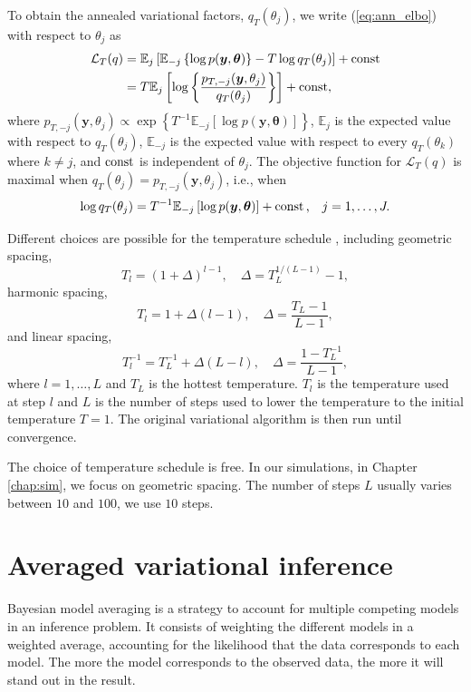\documentclass[a4paper, 11pt]{report}
\numberwithin{equation}{chapter}
\DeclareMathOperator*{\const}{{\rm const}}
\begin{document}
To obtain the annealed variational factors, $q_T(\theta_j)$, we write (\ref{eq:ann_elbo}) with respect to $\theta_j$ as
\begin{align*}
\mathcal{L}_T(q) &= \mathbb{E}_j\left[\mathbb{E}_{-j}\left\lbrace \log p(\boldsymbol{y},\boldsymbol{\theta})\right\rbrace - T \log q_T(\theta_j)\right]+ \const\\
&= T\mathbb{E}_j\left[\log\left\lbrace\frac{p_{T, -j}(\boldsymbol{y}, \theta_j)}{q_T(\theta_j)}\right\rbrace\right] + \const,	
\end{align*}
where $p_{T, -j}(\boldsymbol{y},\theta_j) \propto \exp\left\lbrace T^{-1}\mathbb{E}_{-j}\left[\log p(\boldsymbol{y},\boldsymbol{\theta})\right]\right\rbrace$, $\mathbb{E}_j$ is the expected value with respect to $q_T(\theta_j)$, $\mathbb{E}_{-j}$ is the expected value with respect to every $ q_T(\theta_k)$ where $k \neq j$, and $\const$ is independent of $\theta_j$. The objective function for $\mathcal{L}_T(q)$ is maximal when $q_T(\theta_j) = p_{T,-j}(\boldsymbol{y},\theta_j)$, i.e., when
\begin{equation*}
\log q_T(\theta_j) = T^{-1} \mathbb{E}_{-j}\left[\log p(\boldsymbol{y}, \boldsymbol{\theta})\right] + \const\text{,}\quad j=1,\dots,J.
\end{equation*}

Different choices are possible for the temperature schedule \citep{helen}, including geometric spacing,
\begin{equation*}
T_l = (1 + \Delta)^{l-1},\quad \Delta = T_L^{1/(L-1)}-1,
\end{equation*}
harmonic spacing,
\begin{equation*}
T_l = 1 + \Delta(l-1), \quad \Delta =\frac{T_L-1}{L-1},
\end{equation*}
and linear spacing,
\begin{equation*}
T_l^{-1} = T_L^{-1} + \Delta (L-l), \quad \Delta = \frac{1-T_L^{-1}}{L-1},
\end{equation*}
where $l = 1,\dots,L$ and $T_L$ is the hottest temperature. $T_l$ is the temperature used at step $l$ and $L$ is the number of steps used to lower the temperature to the initial temperature $T = 1$. The original variational algorithm is then run until convergence.

The choice of temperature schedule is free. In our simulations, in Chapter \ref{chap:sim}, we focus on geometric spacing. The number of steps $L$ usually varies between $10$ and $100$, we use $10$ steps.
\section{Averaged variational inference} \label{sec:var_inf}
Bayesian model averaging is a strategy to account for multiple competing models in an inference problem. It consists of weighting the different models in a weighted average, accounting for the likelihood that the data corresponds to each model. The more the model corresponds to the observed data, the more it will stand out in the result.
\end{document}
